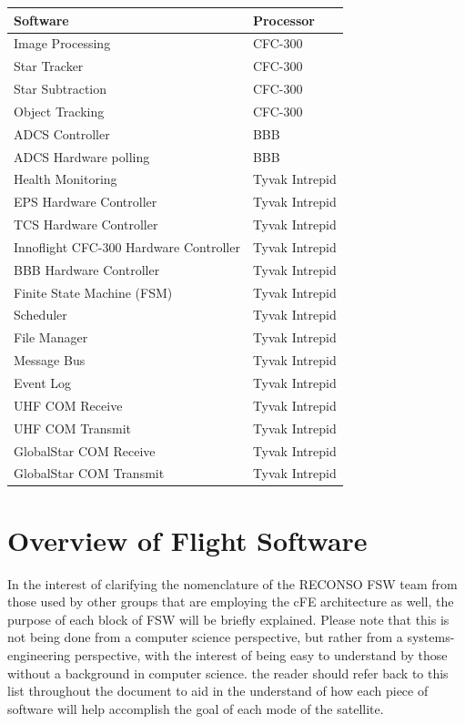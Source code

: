 \documentclass{article}
\begin{document}
\begin{table}[h!]
\begin{adjustbox}{center}
\quad

\begin{tabular}{|l|l|}
\hline
Software & Processor \\ \hline \hline
Image Processing & CFC-300 \\ \hline
Star Tracker & CFC-300 \\ \hline
Star Subtraction & CFC-300 \\ \hline
Object Tracking & CFC-300 \\ \hline \hline
ADCS Controller & BBB \\ \hline
ADCS Hardware polling & BBB \\ \hline \hline
Health Monitoring & Tyvak Intrepid \\ \hline
EPS Hardware Controller & Tyvak Intrepid \\ \hline
TCS Hardware Controller & Tyvak Intrepid \\ \hline
Innoflight CFC-300 Hardware Controller & Tyvak Intrepid \\ \hline
BBB Hardware Controller & Tyvak Intrepid \\ \hline
Finite State Machine (FSM) & Tyvak Intrepid \\ \hline
Scheduler & Tyvak Intrepid \\ \hline
File Manager & Tyvak Intrepid \\ \hline
Message Bus & Tyvak Intrepid \\ \hline
Event Log & Tyvak Intrepid \\ \hline
UHF COM Receive & Tyvak Intrepid \\ \hline
UHF COM Transmit & Tyvak Intrepid \\ \hline
GlobalStar COM Receive & Tyvak Intrepid \\ \hline
GlobalStar COM Transmit & Tyvak Intrepid \\ \hline
\end{tabular}
\end{adjustbox}
\end{table}

\newpage

\section{Overview of Flight Software}

In the interest of clarifying the nomenclature of the RECONSO FSW team from those used by other groups that are employing the cFE architecture as well, the purpose of each block of FSW will be briefly explained. Please note that this is not being done from a computer science perspective, but rather from a systems-engineering perspective, with the interest of being easy to understand by those without a background in computer science. the reader should refer back to this list throughout the document to aid in the understand of how each piece of software will help accomplish the goal of each mode of the satellite.
\end{document}
